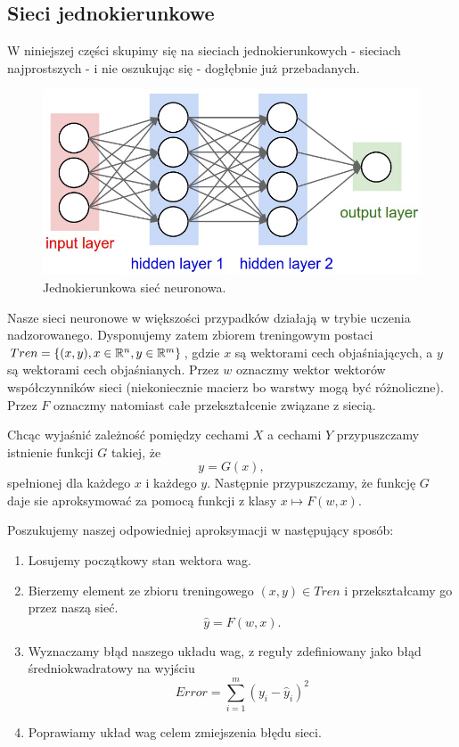 \documentclass[10pt,a4paper]{book}
\begin{document}
\subsection{Sieci jednokierunkowe}
W niniejszej części skupimy się na sieciach jednokierunkowych - sieciach najprostszych - i nie oszukując się - dogłębnie już przebadanych.
\begin{figure}
\centering
\includegraphics[scale=0.3]{images/siec_neuronowa.jpg}
\caption{Jednokierunkowa sieć neuronowa.} \label{fig.chapter.predictions.FNN.schemat}
\end{figure}

Nasze sieci neuronowe w większości przypadków działają w trybie uczenia nadzorowanego. Dysponujemy zatem zbiorem treningowym postaci $ Tren = \left\lbrace { (x,y), x \in \mathbb{R}^n, y \in \mathbb{R}^m} \right\rbrace$, gdzie $x$ są wektorami cech objaśniających, a $y$ są wektorami cech objaśnianych. Przez $w$ oznaczmy wektor wektorów współczynników sieci (niekoniecznie macierz bo warstwy mogą być różnoliczne). Przez $F$ oznaczmy natomiast całe przekształcenie związane z siecią.

Chcąc wyjaśnić zależność pomiędzy cechami $X$ a cechami $Y$ przypuszczamy istnienie funkcji $G$ takiej, że 
\begin{equation*}
y = G(x),
\end{equation*}
spełnionej dla każdego $x$ i każdego $y$. Następnie przypuszczamy, że funkcję $G$ daje sie aproksymować za pomocą funkcji z klasy $x \mapsto F(w,x)$. 

Poszukujemy naszej odpowiedniej aproksymacji w następujący sposób:
\begin{enumerate}
\item Losujemy początkowy stan wektora wag.
\item Bierzemy element ze zbioru treningowego $(x,y) \in Tren$ i przekształcamy go przez naszą sieć.
\begin{equation*}
\hat{y} = F(w,x).
\end{equation*}
\item Wyznaczamy błąd naszego układu wag, z reguły zdefiniowany jako błąd średniokwadratowy na wyjściu
\begin{equation*}
Error = \sum_{i = 1}^{m} (y_i - \hat{y}_i)^2
\end{equation*}
\item Poprawiamy układ wag celem zmiejszenia błędu sieci.
\end{enumerate}
\end{document}
